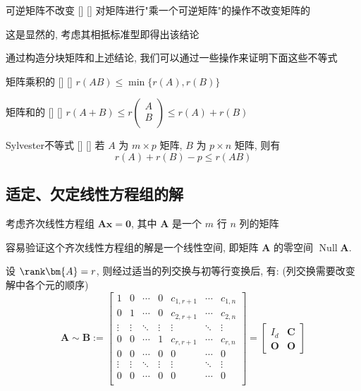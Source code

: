 \documentclass[UTF8]{ctexart}
\DeclareMathOperator{\0}{\mathbf{0}}
\DeclareMathOperator{\Null}{Null}
\DeclareMathOperator{\<}{\langle}
\renewcommand{\>}{\rangle}
\begin{document}
	    \begin{ppt}
			[]
			{可逆矩阵不改变\秩}
			[]
			[]
            对矩阵进行"乘一个可逆矩阵"的操作不改变矩阵的\秩
        \end{ppt}
        \begin{prf}
            这是显然的, 考虑其相抵标准型即得出该结论
        \end{prf}
        通过构造分块矩阵和上述结论, 我们可以通过一些操作来证明下面这些\秩 不等式
        \begin{thm}
			[]
			{矩阵乘积的\秩}
			[]
			[]
             \(r(AB)\leq \min\{r(A),r(B)\}\) 
        \end{thm}
        \begin{thm}
			[]
			{矩阵和的\秩}
			[]
			[]
             \(r(A + B) \leq r\begin{pmatrix} A \\ B \\ \end{pmatrix} \leq r(A) + r(B)\) 
        \end{thm}

        \begin{thm}
			[]
			{Sylvester不等式}
			[]
			[]
            若 \(A\) 为 \(m\times p\) 矩阵,  \(B\) 为 \(p\times n\) 矩阵, 则有
            \[r(A)+r(B)-p\leq r(AB)\]
        \end{thm}
	\subsection{适定、欠定线性方程组的解}

		考虑齐次线性方程组 \(\bm{A}\bm{x}=\mathbf{0}\), 其中 \(\bm{A}\) 是一个 \(m\) 行 \(n\) 列的矩阵

		容易验证这个齐次线性方程组的解是一个线性空间, 即矩阵 \(\bm{A}\) 的零空间 \(\Null\bm{A}\). 

		设 \(\rank\bm{A}=r\), 则经过适当的列交换与初等行变换后, 有: (列交换需要改变解中各个元的顺序)
		\[\bm{A}\sim\mathbf{B}:=
		\begin{bmatrix}
			1 & 0 & \cdots & 0 & c_{1,r+1} & \cdots & c_{1,n}\\
			0 & 1 & \cdots & 0 & c_{2,r+1} & \cdots & c_{2,n}\\
			\vdots & \vdots & \ddots & \vdots & \vdots & \ddots & \vdots\\
			0 & 0 & \cdots & 1 & c_{r,r+1} & \cdots & c_{r,n}\\
			0 & 0 & \cdots & 0 & 0 & \cdots & 0\\
			\vdots & \vdots & \ddots & \vdots & \vdots & \ddots & \vdots\\
			0 & 0 & \cdots & 0 & 0 & \cdots & 0\\
		\end{bmatrix}
		=
		\begin{bmatrix}
			I_d & \mathbf{C}\\
			\mathbf{O} & \mathbf{O}
		\end{bmatrix}\]
\end{document}
